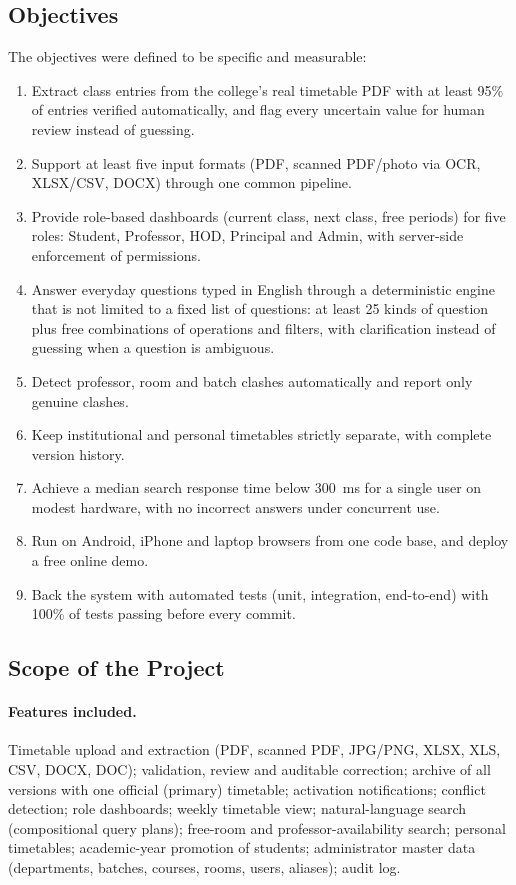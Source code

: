 \subsection{Objectives}
The objectives were defined to be specific and measurable:
\begin{enumerate}[label=\textbf{O\arabic*.}]
\item Extract class entries from the college's real timetable PDF with at least 95\% of entries
      verified automatically, and flag every uncertain value for human review instead of guessing.
\item Support at least five input formats (PDF, scanned PDF/photo via OCR, XLSX/CSV, DOCX) through one
      common pipeline.
\item Provide role-based dashboards (current class, next class, free periods) for five roles:
      Student, Professor, HOD, Principal and Admin, with server-side enforcement of permissions.
\item Answer everyday questions typed in English through a deterministic engine that is not limited to
      a fixed list of questions: at least 25 kinds of question plus free combinations of operations and
      filters, with clarification instead of guessing when a question is ambiguous.
\item Detect professor, room and batch clashes automatically and report only genuine clashes.
\item Keep institutional and personal timetables strictly separate, with complete version history.
\item Achieve a median search response time below 300~ms for a single user on modest hardware, with
      no incorrect answers under concurrent use.
\item Run on Android, iPhone and laptop browsers from one code base, and deploy a free online demo.
\item Back the system with automated tests (unit, integration, end-to-end) with 100\% of tests passing
      before every commit.
\end{enumerate}

\subsection{Scope of the Project}
\paragraph{Features included.}
Timetable upload and extraction (PDF, scanned PDF, JPG/PNG, XLSX, XLS, CSV, DOCX, DOC); validation,
review and auditable correction; archive of all versions with one official (primary) timetable;
activation notifications; conflict detection; role dashboards; weekly timetable view; natural-language
search (compositional query plans); free-room and professor-availability search; personal timetables; academic-year
promotion of students; administrator master data (departments, batches, courses, rooms, users,
aliases); audit log.

